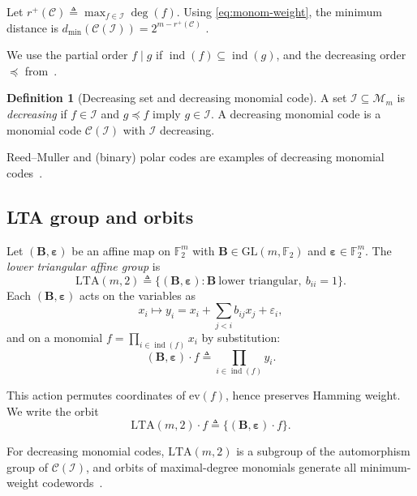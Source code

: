 \documentclass[conference]{IEEEtran}
\theoremstyle{definition}
\newtheorem{definition}{Definition}
\DeclareMathOperator{\LTA}{LTA}
\newcommand{\I}{\mathcal{I}}
\newcommand{\C}{\mathcal{C}}
\newcommand{\bB}{\mathbf{B}}
\newcommand{\ind}{\operatorname{ind}}
\newcommand{\ft}{\mathbb{F}_2}
\newcommand{\Mon}{\mathcal{M}_{m}}
\begin{document}
Let $r^+(\C)\triangleq\max_{f\in\I}\deg(f)$. Using \eqref{eq:monom-weight}, the minimum distance is $d_{\min}(\C(\I)) = 2^{m-r^+(\C)}$ \cite{bardet}.

We use the partial order $f\mid g$ if $\ind(f)\subseteq\ind(g)$, and the decreasing order $\preceq$ from~\cite{bardet2016crypt,bardet}. %

\begin{definition}[Decreasing set and decreasing monomial code]
A set $\I\subseteq\Mon$ is \emph{decreasing} if $f\in\I$ and $g\preceq f$ imply $g\in\I$. A decreasing monomial code is a monomial code $\C(\I)$ with $\I$ decreasing.
\end{definition}

Reed--Muller and (binary) polar codes are examples of decreasing monomial codes~\cite{bardet2016crypt}.

\subsection{LTA group and orbits}

Let $(\bB,\bm\varepsilon)$ be an affine map on $\ft^m$ with $\bB\in\mathrm{GL}(m,\ft)$ and $\bm\varepsilon\in\ft^m$. The \emph{lower triangular affine group} is
\[
\mathrm{LTA}(m,2)\triangleq\big\{(\bB,\bm\varepsilon) : \bB\ \text{lower triangular},\ b_{ii}=1\big\}.
\]
Each $(\bB,\bm\varepsilon)$ acts on the variables as
\[
x_i \mapsto y_i = x_i + \sum_{j<i} b_{ij} x_j + \varepsilon_i,
\]
and on a monomial $f=\prod_{i\in\ind(f)} x_i$ by substitution:
\[
(\bB,\bm\varepsilon)\cdot f \triangleq \prod_{i\in\ind(f)} y_i.
\]

This action permutes coordinates of $\mathrm{ev}(f)$, hence preserves Hamming weight. We write the orbit
\[
\mathrm{LTA}(m,2)\cdot f \triangleq \{(\bB,\bm\varepsilon)\cdot f\}.
\]

For decreasing monomial codes, $\mathrm{LTA}(m,2)$ is a subgroup of the automorphism group of $\C(\I)$, and orbits of maximal-degree monomials generate all minimum-weight codewords~\cite{bardet}.

\end{document}
